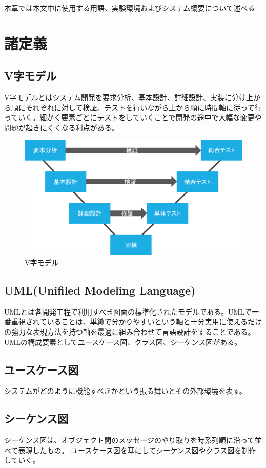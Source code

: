 本章では本文中に使用する用語、実験環境およびシステム概要について述べる

\section{諸定義}

\subsection*{V字モデル}
V字モデルとはシステム開発を要求分析、基本設計、詳細設計、実装に分け上から順にそれぞれに対して検証、テストを行いながら上から順に時間軸に従って行っていく。細かく要素ごとにテストをしていくことで開発の途中で大幅な変更や問題が起きにくくなる利点がある。

\begin{figure}[htbp]
\centering
\includegraphics[width=12cm]{./pic/vjimodel.eps}
\caption{V字モデル}
\label{v_model}
\end{figure}

\subsection*{UML(Unifiled Modeling Language)}
UMLとは各開発工程で利用すべき図面の標準化されたモデルである。UMLで一番重視されていることは、単純で分かりやすいという軸と十分実用に使えるだけの強力な表現方法を持つ軸を最適に組み合わせて言語設計をすることである。UMLの構成要素としてユースケース図、クラス図、シーケンス図がある。\cite{uml}

\subsection*{ユースケース図}
システムがどのように機能すべきかという振る舞いとその外部環境を表す。


\subsection*{シーケンス図}
シーケンス図は、オブジェクト間のメッセージのやり取りを時系列順に沿って並べて表現したもの。
ユースケース図を基にしてシーケンス図やクラス図を制作していく。


